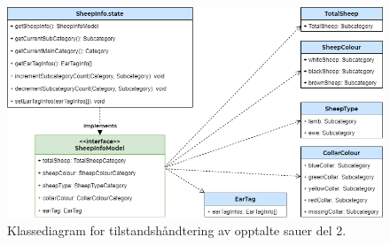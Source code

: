 \begin{figure}[H]
\centering
\captionsetup{width=.8\linewidth}
\includegraphics[scale=0.6]{Figurer/diagram/tilstand_sau_state).png}
\caption{Klassediagram for tilstandshåndtering av opptalte sauer del 2.}
\label{fig:tilstand_sau_state}
\end{figure}


